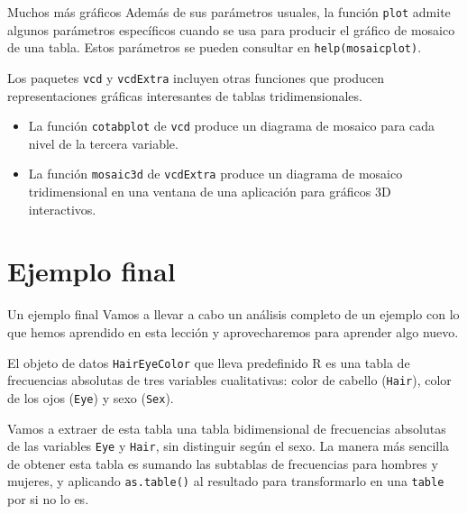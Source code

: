 \documentclass[
  ignorenonframetext,
]{beamer}
\providecommand{\tightlist}{%
  \setlength{\itemsep}{0pt}\setlength{\parskip}{0pt}}
\begin{document}
\begin{frame}[fragile]{Muchos más gráficos}
\label{muchos-muxe1s-gruxe1ficos}
Además de sus parámetros usuales, la función \texttt{plot} admite
algunos parámetros específicos cuando se usa para producir el gráfico de
mosaico de una tabla. Estos parámetros se pueden consultar en
\texttt{help(mosaicplot)}.

Los paquetes \texttt{vcd} y \texttt{vcdExtra} incluyen otras funciones
que producen representaciones gráficas interesantes de tablas
tridimensionales.

\begin{itemize}
\tightlist
\item
  La función \texttt{cotabplot} de \texttt{vcd} produce un diagrama de
  mosaico para cada nivel de la tercera variable.
\item
  La función \texttt{mosaic3d} de \texttt{vcdExtra} produce un diagrama
  de mosaico tridimensional en una ventana de una aplicación para
  gráficos 3D interactivos.
\end{itemize}
\end{frame}

\section{Ejemplo final}\label{ejemplo-final}

\begin{frame}[fragile]{Un ejemplo final}
\label{un-ejemplo-final}
Vamos a llevar a cabo un análisis completo de un ejemplo con lo que
hemos aprendido en esta lección y aprovecharemos para aprender algo
nuevo.

El objeto de datos \texttt{HairEyeColor} que lleva predefinido R es una
tabla de frecuencias absolutas de tres variables cualitativas: color de
cabello (\texttt{Hair}), color de los ojos (\texttt{Eye}) y sexo
(\texttt{Sex}).

Vamos a extraer de esta tabla una tabla bidimensional de frecuencias
absolutas de las variables \texttt{Eye} y \texttt{Hair}, sin distinguir
según el sexo. La manera más sencilla de obtener esta tabla es sumando
las subtablas de frecuencias para hombres y mujeres, y aplicando
\texttt{as.table()} al resultado para transformarlo en una
\texttt{table} por si no lo es.
\end{frame}
\end{document}
